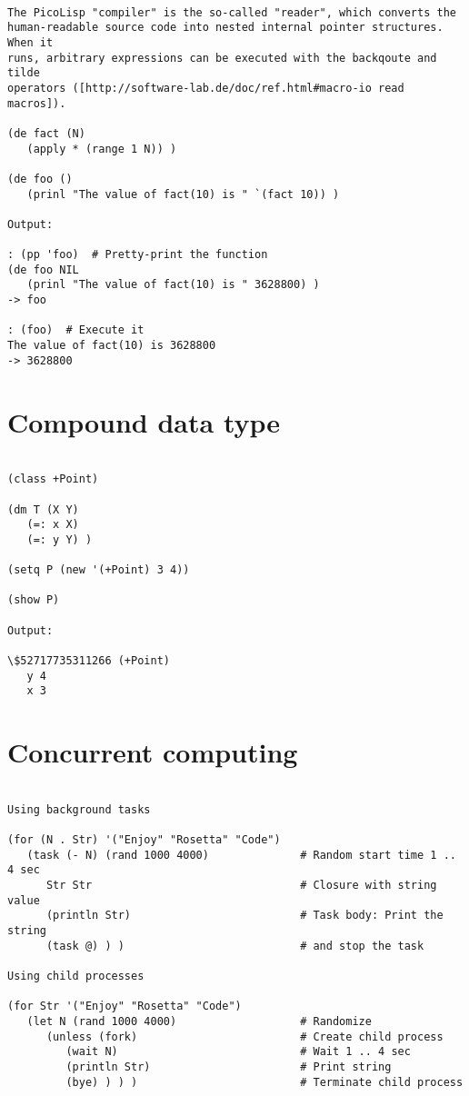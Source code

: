 \begin{verbatim}

The PicoLisp "compiler" is the so-called "reader", which converts the
human-readable source code into nested internal pointer structures. When it
runs, arbitrary expressions can be executed with the backqoute and tilde
operators ([http://software-lab.de/doc/ref.html#macro-io read macros]).

(de fact (N)
   (apply * (range 1 N)) )

(de foo ()
   (prinl "The value of fact(10) is " `(fact 10)) )

Output:

: (pp 'foo)  # Pretty-print the function
(de foo NIL
   (prinl "The value of fact(10) is " 3628800) )
-> foo

: (foo)  # Execute it
The value of fact(10) is 3628800
-> 3628800

\end{verbatim}

\section*{Compound data type}

\begin{verbatim}

(class +Point)

(dm T (X Y)
   (=: x X)
   (=: y Y) )

(setq P (new '(+Point) 3 4))

(show P)

Output:

\$52717735311266 (+Point)
   y 4
   x 3

\end{verbatim}

\section*{Concurrent computing}

\begin{verbatim}

Using background tasks

(for (N . Str) '("Enjoy" "Rosetta" "Code")
   (task (- N) (rand 1000 4000)              # Random start time 1 .. 4 sec
      Str Str                                # Closure with string value
      (println Str)                          # Task body: Print the string
      (task @) ) )                           # and stop the task

Using child processes

(for Str '("Enjoy" "Rosetta" "Code")
   (let N (rand 1000 4000)                   # Randomize
      (unless (fork)                         # Create child process
         (wait N)                            # Wait 1 .. 4 sec
         (println Str)                       # Print string
         (bye) ) ) )                         # Terminate child process

\end{verbatim}

